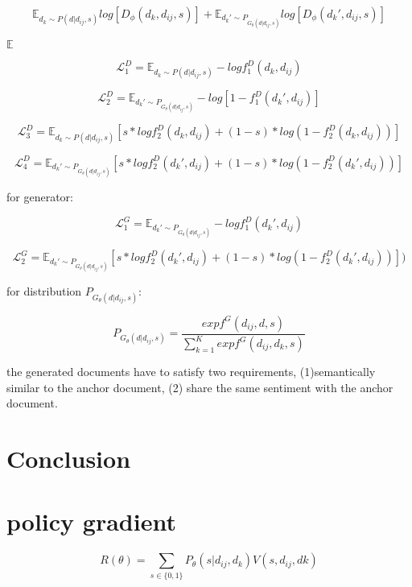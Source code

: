 \documentclass[3p,review]{elsarticle}
\begin{document}
\begin{equation}\label{eq:gen}
\mathbb{E}_{d_k\sim P(d|d_{ij},s)}log[D_{\phi}(d_k,d_{ij},s)]+\mathbb{E}_{d_k'\sim P_{G_{\theta}(d|d_{ij},s)}}log[D_{\phi}(d_k',d_{ij},s)]
\end{equation}

$\mathbb{E}$

\begin{equation}\label{eq:d1}
  \mathcal{L}_1^D=\mathbb{E}_{d_k\sim P(d|d_{ij},s)}-logf_1^D(d_k,d_{ij})
\end{equation}

\begin{equation}\label{eq:d2}
  \mathcal{L}_2^D=\mathbb{E}_{d_k'\sim P_{G_{\theta}(d|d_{ij},s)}}-log[1-f_1^D(d_k',d_{ij})]
\end{equation}


\begin{equation}\label{eq:d1}
  \mathcal{L}_3^D=\mathbb{E}_{d_k\sim P(d|d_{ij},s)}[s*log f_2^D(d_k,d_{ij})+(1-s)*log(1-f_2^D(d_k,d_{ij}))]
\end{equation}


\begin{equation}\label{eq:d1}
  \mathcal{L}_4^D=\mathbb{E}_{d_k'\sim P_{G_{\theta}(d|d_{ij},s)}}[s*log f_2^D(d_k',d_{ij})+(1-s)*log(1-f_2^D(d_k',d_{ij}))]
\end{equation}


for generator:

\begin{equation}\label{eq:g1}
  \mathcal{L}_1^G=\mathbb{E}_{d_k'\sim P_{G_{\theta}(d|d_{ij},s)}}-logf_1^D(d_k',d_{ij})
\end{equation}

\begin{equation}\label{eq:g1}
  \mathcal{L}_2^G=\mathbb{E}_{d_k'\sim P_{G_{\theta}(d|d_{ij},s)}}[s*log f_2^D(d_k',d_{ij})+(1-s)*log(1-f_2^D(d_k',d_{ij}))] )
\end{equation}

for distribution $P_{G_{\theta}(d|d_{ij},s)}$:

\begin{equation}\label{eq:pg}
  P_{G_{\theta}(d|d_{ij},s)}=\frac{exp f^G(d_{ij},d,s)}{\sum_{k=1}^Kexp f^G(d_{ij}, d_k, s)}
\end{equation}


the generated documents have to satisfy two requirements, (1)semantically similar to the anchor document, (2) share the same sentiment with the anchor document.

\section{Conclusion}
\section{policy gradient}



\begin{equation}\label{eq:p}
  R(\theta)=\sum_{s\in\{0,1\}}P_{\theta}(s|d_{ij},d_k)V(s,d_{ij},d{k})
\end{equation}








% 
\end{document}
